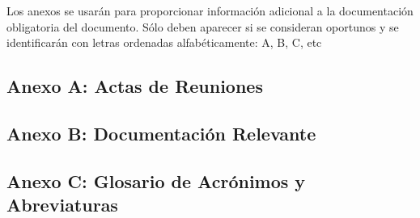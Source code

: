 \begin{textoazul}
Los anexos se usarán para proporcionar información adicional a la documentación obligatoria del documento. Sólo deben aparecer si se consideran oportunos y se identificarán con letras ordenadas alfabéticamente: A, B, C, etc
\end{textoazul}
 
\subsection{Anexo A: Actas de Reuniones}

 
\subsection{Anexo B: Documentación Relevante}

 
\subsection{Anexo C: Glosario de Acrónimos y Abreviaturas}

 
